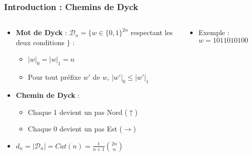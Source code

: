 \documentclass{beamer}
\begin{document}
\begin{frame}
    \frametitle{Introduction : Chemins de Dyck}
    \begin{columns}
        \begin{column}{0.6\textwidth}
            \begin{itemize}
                \item \textbf{Mot de Dyck} : $\mathcal{D}_n = \{w \in
                    \{0,1\}^{2n}$ respectant les deux conditions $\}$ :
                \begin{itemize}
                    \item $|w|_0 = |w|_1 = n$
                    \item Pour tout préfixe $w'$ de $w$, $|w'|_0 \leqslant
                        |w'|_1$
                \end{itemize}
                \item \textbf{Chemin de Dyck} :
                \begin{itemize}
                    \item Chaque 1 devient un pas Nord ($\uparrow$)
                    \item Chaque 0 devient un pas Est ($\rightarrow$)
                \end{itemize}
                \item $\displaystyle d_n = |\mathcal{D}_n| = Cat(n) =
                    \frac{1}{n+1}\binom{2n}{n}$
            \end{itemize}
        \end{column}
        \begin{column}{0.4\textwidth}
            \begin{itemize}
                \item Exemple : $w = 1011010100$
            \end{itemize}
            
        \end{column}
    \end{columns}
\end{frame}
\end{document}
